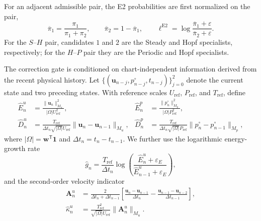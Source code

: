 For an adjacent admissible pair, the E2 probabilities are first normalized on
the pair,
\begin{equation}
  \overline{\pi}_1
  =\frac{\pi_1}{\pi_1+\pi_2},
  \qquad
  \overline{\pi}_2=1-\overline{\pi}_1,
  \qquad
  \ell^{\mathrm{E2}}
  =
  \log\frac{\overline{\pi}_1+\varepsilon}
            {\overline{\pi}_2+\varepsilon}.
  \label{eq:t2c_pair_logit}
\end{equation}
For the $S$--$H$ pair, candidates $1$ and $2$ are the Steady and Hopf
specialists, respectively; for the $H$--$P$ pair they are the Periodic and
Hopf specialists.

The correction gate is conditioned on chart-independent information derived
from the recent physical history.  Let
$\{(\boldsymbol{u}_{n-j},p^{\circ}_{n-j},t_{n-j})\}_{j=0}^{2}$ denote the
current state and two preceding states.  With reference scales
$U_{\mathrm{ref}}$, $P_{\mathrm{ref}}$, and $T_{\mathrm{ref}}$, define
\begin{align}
  \widehat E_n^u
  &=\frac{\|\boldsymbol{u}_n\|_{M_u}^2}
          {|\Omega|U_{\mathrm{ref}}^2},
  &
  \widehat E_n^p
  &=\frac{\|p_n^{\circ}\|_{M_p}^2}
          {|\Omega|P_{\mathrm{ref}}^2},
  \label{eq:dimensionless_physical_energies}\\
  \widehat D_n^u
  &=\frac{T_{\mathrm{ref}}}
          {\Delta t_n\sqrt{|\Omega|}U_{\mathrm{ref}}}
    \|\boldsymbol{u}_n-\boldsymbol{u}_{n-1}\|_{M_u},
  &
  \widehat D_n^p
  &=\frac{T_{\mathrm{ref}}}
          {\Delta t_n\sqrt{|\Omega|}P_{\mathrm{ref}}}
    \|p_n^{\circ}-p_{n-1}^{\circ}\|_{M_p},
  \label{eq:dimensionless_physical_change_rates}
\end{align}
where $|\Omega|=\boldsymbol{w}^{\mathsf T}\boldsymbol{1}$ and
$\Delta t_n=t_n-t_{n-1}$.  We further use the logarithmic energy-growth rate
\begin{equation}
  \widehat g_n
  =
  \frac{T_{\mathrm{ref}}}{\Delta t_n}
  \log\left(
    \frac{\widehat E_n^u+\varepsilon_E}
         {\widehat E_{n-1}^u+\varepsilon_E}
  \right),
  \label{eq:dimensionless_log_energy_growth}
\end{equation}
and the second-order velocity indicator
\begin{align}
  \boldsymbol{A}^{u}_n
  &=
  \frac{2}{\Delta t_n+\Delta t_{n-1}}
  \left[
    \frac{\boldsymbol{u}_n-\boldsymbol{u}_{n-1}}{\Delta t_n}
    -
    \frac{\boldsymbol{u}_{n-1}-\boldsymbol{u}_{n-2}}{\Delta t_{n-1}}
  \right],
  \label{eq:discrete_velocity_acceleration}\\
  \widehat\kappa_n^u
  &=
  \frac{T_{\mathrm{ref}}^2}
       {\sqrt{|\Omega|}U_{\mathrm{ref}}}
  \|\boldsymbol{A}^{u}_n\|_{M_u}.
  \label{eq:dimensionless_velocity_curvature}
\end{align}
